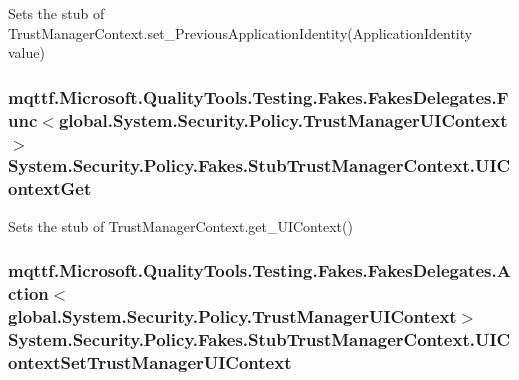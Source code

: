 Sets the stub of Trust\-Manager\-Context.\-set\-\_\-\-Previous\-Application\-Identity(\-Application\-Identity value)

\hypertarget{class_system_1_1_security_1_1_policy_1_1_fakes_1_1_stub_trust_manager_context_a73005072109cf8ff948fcefb4a581686}{
\subsubsection[{U\-I\-Context\-Get}]{\setlength{\rightskip}{0pt plus 5cm}mqttf.\-Microsoft.\-Quality\-Tools.\-Testing.\-Fakes.\-Fakes\-Delegates.\-Func$<$global.\-System.\-Security.\-Policy.\-Trust\-Manager\-U\-I\-Context$>$ System.\-Security.\-Policy.\-Fakes.\-Stub\-Trust\-Manager\-Context.\-U\-I\-Context\-Get}}\label{class_system_1_1_security_1_1_policy_1_1_fakes_1_1_stub_trust_manager_context_a73005072109cf8ff948fcefb4a581686}


Sets the stub of Trust\-Manager\-Context.\-get\-\_\-\-U\-I\-Context()

\hypertarget{class_system_1_1_security_1_1_policy_1_1_fakes_1_1_stub_trust_manager_context_a52a0c9f6adb5b02c2a9160d3353c109d}{
\subsubsection[{U\-I\-Context\-Set\-Trust\-Manager\-U\-I\-Context}]{\setlength{\rightskip}{0pt plus 5cm}mqttf.\-Microsoft.\-Quality\-Tools.\-Testing.\-Fakes.\-Fakes\-Delegates.\-Action$<$global.\-System.\-Security.\-Policy.\-Trust\-Manager\-U\-I\-Context$>$ System.\-Security.\-Policy.\-Fakes.\-Stub\-Trust\-Manager\-Context.\-U\-I\-Context\-Set\-Trust\-Manager\-U\-I\-Context}}\label{class_system_1_1_security_1_1_policy_1_1_fakes_1_1_stub_trust_manager_context_a52a0c9f6adb5b02c2a9160d3353c109d}


